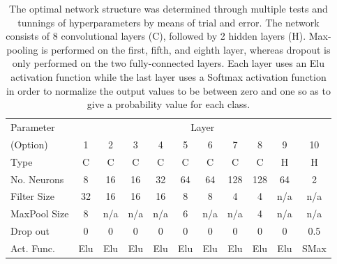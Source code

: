 \documentclass[%
showpacs,
 amsmath,amssymb,
 aps,
 twocolumn,
 prl,
 reprint,
floatfix,
]{revtex4-1}
\begin{document}
\begin{table}[]
\begin{tabular}{lcccccccccc}
\hline
\hline
Parameter & \multicolumn{10}{c}{Layer}\\
\cline{2-11}
(Option) & 1 & 2 & 3 & 4 & 5 & 6 & 7 & 8 & 9 & 10 \\
\hline
Type & C & C & C & C & C & C & C & C & H & H \\
No. Neurons  & 8  & 16  & 16 & 32 & 64 & 64 & 128 & 128 & 64  & 2  \\
Filter Size  & 32 & 16  & 16 & 16 & 8  & 8  & 4   & 4   & n/a & n/a \\
MaxPool Size & 8 & n/a & n/a & n/a & 6 & n/a & n/a & 4 & n/a & n/a \\
Drop out  & 0 & 0 & 0 & 0 & 0 & 0 & 0 & 0 & 0 & 0.5 \\
Act. Func. & Elu & Elu & Elu & Elu & Elu & Elu & Elu & Elu & Elu & SMax \\
\hline
\end{tabular}
\caption{The optimal network structure was determined through multiple tests
and tunnings of hyperparameters by means of trial and error. The network
consists of 8 convolutional layers (C), followed by 2 hidden layers (H).
Max-pooling is performed on the first, fifth, and eighth layer,
whereas dropout is only performed on the two fully-connected layers. Each layer
uses an Elu activation function while the last layer uses a Softmax activation
function in order to normalize the output values to be between zero and one so
as to give a probability value for each class.\label{table:network}}
\end{table}
\end{document}
